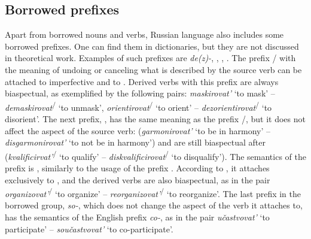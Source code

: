 \subsection{Borrowed prefixes}\label{subsection:perf:prefixes}
%
%
%
Apart from borrowed nouns and verbs, Russian language also includes some borrowed prefixes.  One can find them in dictionaries, but they are not discussed in theoretical work. Examples of such prefixes are \textit{de(z)-}, , , . The prefix / with the meaning of undoing or canceling what is described by the source verb can be attached to imperfective and to . Derived verbs with this prefix are always biaspectual, as exemplified by the following pairs: \textit{maskirovat'}\textsuperscript{\IPF} `to mask' -- \textit{demaskirovat}\textsuperscript{\IPF\slash\PF} `to unmask', \textit{orientirovat}\textsuperscript{\IPF\slash\PF} `to orient' -- \textit{dezorientirovat}\textsuperscript{\IPF\slash\PF} `to disorient'. The next prefix, , has the same meaning as the prefix /, but it does not affect the aspect of the source verb:   (\textit{garmonirovat'}\textsuperscript{\IPF} `to be in harmony' -- \textit{disgarmonirovat'}\textsuperscript{\IPF} `to not be in harmony') and  are still biaspectual after  (\textit{kvalificirvat'}\textsuperscript{\IPF\slash\PF} `to qualify' -- \textit{diskvalificirovat}\textsuperscript{\IPF\slash\PF} `to disqualify'). The semantics of the prefix  is , similarly to the  usage of the prefix . According to \citet[369]{Shvedova:82}, it attaches exclusively to , and the derived verbs are also biaspectual, as in the pair \textit{organizovat'}\textsuperscript{\IPF\slash\PF}  `to organize' -- \textit{reorganizovat'}\textsuperscript{\IPF\slash\PF}  `to reorganize'. The last prefix in the borrowed group, \textit{so-}, which does not change the aspect of the verb it attaches to, has the semantics of the English prefix \textit{co-}, as in the pair  \textit{u\v{c}astvovat'}\textsuperscript{\IPF}  `to participate' -- \textit{sou\v{c}astvovat'}\textsuperscript{\IPF}  `to co-participate'.

